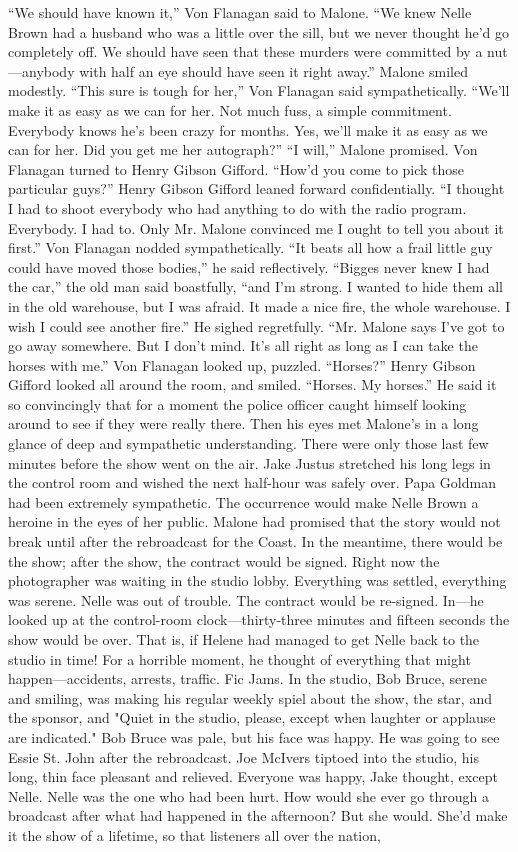 \documentclass{novel}
\begin{document}
“We should have known it,” Von Flanagan said to Malone. “We knew Nelle Brown had a husband who was a little over the sill, but we never thought he’d go completely off. We should have seen that these murders were committed by a nut—anybody with half an eye should have seen it right away.” Malone smiled modestly. “This sure is tough for her,” Von Flanagan said sympathetically. “We’ll make it as easy as we can for her. Not much fuss, a simple commitment. Everybody knows he’s been crazy for months. Yes, we’ll make it as easy as we can for her. Did you get me her autograph?” “I will,” Malone promised. Von Flanagan turned to Henry Gibson Gifford. “How’d you come to pick those particular guys?” Henry Gibson Gifford leaned forward confidentially. “I thought I had to shoot everybody who had anything to do with the radio program. Everybody. I had to. Only Mr. Malone convinced me I ought to tell you about it first.” Von Flanagan nodded sympathetically. “It beats all how a frail little guy could have moved those bodies,” he said reflectively. “Bigges never knew I had the car,” the old man said boastfully, “and I’m strong. I wanted to hide them all in the old warehouse, but I was afraid. It made a nice fire, the whole warehouse. I wish I could see another fire.” He sighed regretfully. “Mr. Malone says I’ve got to go away somewhere. But I don’t mind. It’s all right as long as I can take the horses with me.” Von Flanagan looked up, puzzled. “Horses?” Henry Gibson Gifford looked all around the room, and smiled. “Horses. My horses.” He said it so convincingly that for a moment the police officer caught himself looking around to see if they were really there. Then his eyes met Malone’s in a long glance of deep and sympathetic understanding. There were only those last few minutes before the show went on the air. Jake Justus stretched his long legs in the control room and wished the next half-hour was safely over. Papa Goldman had been extremely sympathetic. The occurrence would make Nelle Brown a heroine in the eyes of her public. Malone had promised that the story would not break until after the rebroadcast for the Coast. In the meantime, there would be the show; after the show, the contract would be signed. Right now the photographer was waiting in the studio lobby. Everything was settled, everything was serene. Nelle was out of trouble. The contract would be re-signed. In—he looked up at the control-room clock—thirty-three minutes and fifteen seconds the show would be over. That is, if Helene had managed to get Nelle back to the studio in time! For a horrible moment, he thought of everything that might happen—accidents, arrests, traffic. Fic Jams. In the studio, Bob Bruce, serene and smiling, was making his regular weekly spiel about the show, the star, and the sponsor, and "Quiet in the studio, please, except when laughter or applause are indicated." Bob Bruce was pale, but his face was happy. He was going to see Essie St. John after the rebroadcast. Joe McIvers tiptoed into the studio, his long, thin face pleasant and relieved. Everyone was happy, Jake thought, except Nelle. Nelle was the one who had been hurt. How would she ever go through a broadcast after what had happened in the afternoon? But she would. She'd make it the show of a lifetime, so that listeners all over the nation, 
\end{document}
